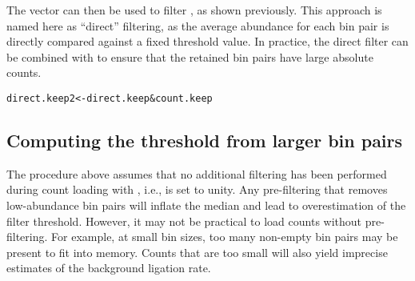 \documentclass{report}\usepackage[]{graphicx}\usepackage[usenames,dvipsnames]{color}
\newcommand{\hlnum}[1]{\textcolor[rgb]{0.816,0.125,0.439}{#1}}%
\newcommand{\hlopt}[1]{\textcolor[rgb]{0,0,0}{#1}}%
\newcommand{\hlstd}[1]{\textcolor[rgb]{0.251,0.251,0.251}{#1}}%
\newcommand{\hlkwb}[1]{\textcolor[rgb]{0,0,0}{#1}}%
\newcommand{\hlkwd}[1]{\textcolor[rgb]{0.878,0.439,0.125}{#1}}%
\newenvironment{knitrout}{}{} %
\begin{document}
\begin{knitrout}
\color{fgcolor}
\end{knitrout}

The  vector can then be used to filter , as shown previously.
This approach is named here as ``direct'' filtering, as the average abundance for each bin pair is directly compared against a fixed threshold value.
In practice, the direct filter can be combined with  to ensure that the retained bin pairs have large absolute counts.

\begin{knitrout}
\color{fgcolor}\begin{kframe}
\begin{alltt}
\hlstd{direct.keep2} \hlkwb{<-} \hlstd{direct.keep} \hlopt{&} \hlstd{count.keep}
\end{alltt}
\end{kframe}
\end{knitrout}

\subsection{Computing the threshold from larger bin pairs}
The procedure above assumes that no additional filtering has been performed during count loading with , i.e.,  is set to unity.
Any pre-filtering that removes low-abundance bin pairs will inflate the median and lead to overestimation of the filter threshold. 
However, it may not be practical to load counts without pre-filtering.
For example, at small bin sizes, too many non-empty bin pairs may be present to fit into memory.
Counts that are too small will also yield imprecise estimates of the background ligation rate.
\end{document}

